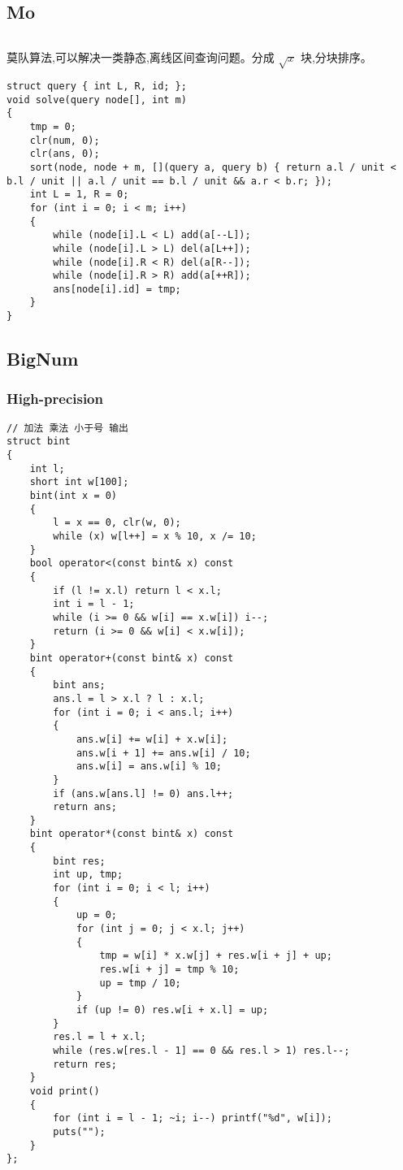 \documentclass[twoside]{article}
\begin{document}
\subsection{Mo}
\begin{lstlisting}
\end{lstlisting}
莫队算法,可以解决一类静态,离线区间查询问题。分成 $\sqrt{x}$ 块,分块排序。
\begin{lstlisting}
struct query { int L, R, id; };
void solve(query node[], int m)
{
    tmp = 0;
    clr(num, 0);
    clr(ans, 0);
    sort(node, node + m, [](query a, query b) { return a.l / unit < b.l / unit || a.l / unit == b.l / unit && a.r < b.r; });
    int L = 1, R = 0;
    for (int i = 0; i < m; i++)
    {
        while (node[i].L < L) add(a[--L]);
        while (node[i].L > L) del(a[L++]);
        while (node[i].R < R) del(a[R--]);
        while (node[i].R > R) add(a[++R]);
        ans[node[i].id] = tmp;
    }
}
\end{lstlisting}
\subsection{BigNum}
\subsubsection{High-precision}
\begin{lstlisting}
// 加法 乘法 小于号 输出
struct bint
{
    int l;
    short int w[100];
    bint(int x = 0)
    {
        l = x == 0, clr(w, 0);
        while (x) w[l++] = x % 10, x /= 10;
    }
    bool operator<(const bint& x) const
    {
        if (l != x.l) return l < x.l;
        int i = l - 1;
        while (i >= 0 && w[i] == x.w[i]) i--;
        return (i >= 0 && w[i] < x.w[i]);
    }
    bint operator+(const bint& x) const
    {
        bint ans;
        ans.l = l > x.l ? l : x.l;
        for (int i = 0; i < ans.l; i++)
        {
            ans.w[i] += w[i] + x.w[i];
            ans.w[i + 1] += ans.w[i] / 10;
            ans.w[i] = ans.w[i] % 10;
        }
        if (ans.w[ans.l] != 0) ans.l++;
        return ans;
    }
    bint operator*(const bint& x) const
    {
        bint res;
        int up, tmp;
        for (int i = 0; i < l; i++)
        {
            up = 0;
            for (int j = 0; j < x.l; j++)
            {
                tmp = w[i] * x.w[j] + res.w[i + j] + up;
                res.w[i + j] = tmp % 10;
                up = tmp / 10;
            }
            if (up != 0) res.w[i + x.l] = up;
        }
        res.l = l + x.l;
        while (res.w[res.l - 1] == 0 && res.l > 1) res.l--;
        return res;
    }
    void print()
    {
        for (int i = l - 1; ~i; i--) printf("%d", w[i]);
        puts("");
    }
};
\end{lstlisting}
\end{document}
